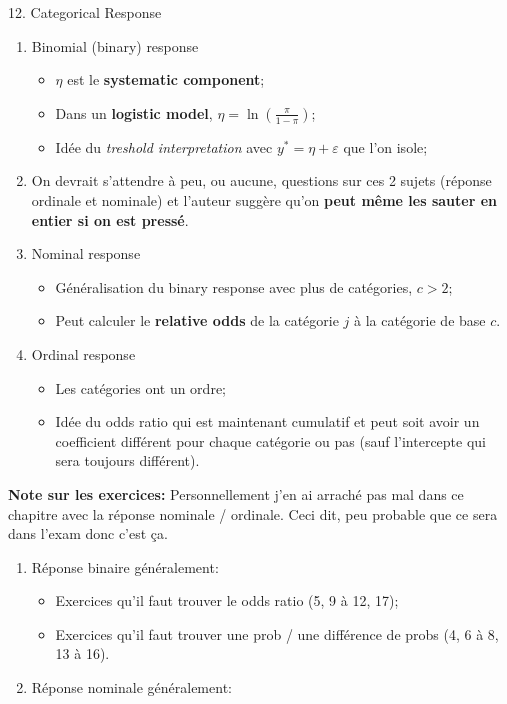\documentclass[12pt, titlepage, french]{report}
\begin{document}
\begin{CHPT_SUMM}{12. Categorical Response}
\begin{enumerate}
	\item	Binomial (binary) response
	\begin{itemize}
		\item	$\eta$ est le \textbf{systematic component};
		\item	Dans un \textbf{logistic model}, $\eta = \ln\left( \frac{\pi}{1 - \pi} \right)$;
		\item	Idée du \textit{treshold interpretation} avec $y^{*} = \eta + \varepsilon$ que l'on isole;
	\end{itemize}
	\item[]	On devrait s'attendre à peu, ou aucune, questions sur ces 2 sujets (réponse ordinale et nominale) et l'auteur suggère qu'on \textbf{peut même les sauter en entier si on est pressé}.
	\item	Nominal response	
	\begin{itemize}
		\item	Généralisation du binary response avec plus de catégories, $c > 2$;
		\item	Peut calculer le \textbf{relative odds} de la catégorie $j$ à la catégorie de base $c$.
	\end{itemize}
	\item	Ordinal response
	\begin{itemize}
		\item	Les catégories ont un ordre;
		\item	Idée du odds ratio qui est maintenant cumulatif et peut soit avoir un coefficient différent pour chaque catégorie ou pas (sauf l'intercepte qui sera toujours différent).
	\end{itemize}
\end{enumerate}
\textbf{Note sur les exercices:} Personnellement j'en ai arraché pas mal dans ce chapitre avec la réponse nominale / ordinale. Ceci dit, peu probable que ce sera dans l'exam donc c'est ça.
\begin{enumerate}
	\item	Réponse binaire généralement:
	\begin{itemize}
		\item	Exercices qu'il faut trouver le odds ratio (5, 9 à 12, 17);
		\item	Exercices qu'il faut trouver une prob / une différence de probs (4, 6 à 8, 13 à 16).
	\end{itemize}
	\item	Réponse nominale généralement:

\end{enumerate}
\end{CHPT_SUMM}
\end{document}
